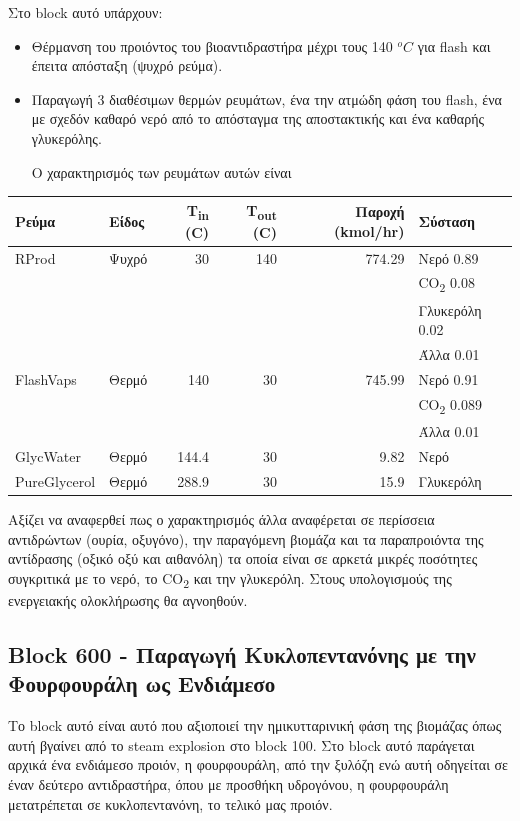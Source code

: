 \documentclass[11pt]{article}
\begin{document}
Στο block αυτό υπάρχουν:
\begin{itemize}
\item Θέρμανση του προιόντος του βιοαντιδραστήρα μέχρι τους 140 \(^oC\) για flash και έπειτα απόσταξη (ψυχρό ρεύμα).
\item Παραγωγή 3 διαθέσιμων θερμών ρευμάτων, ένα την ατμώδη φάση του flash, ένα με σχεδόν καθαρό νερό από το απόσταγμα της αποστακτικής και ένα καθαρής γλυκερόλης.

Ο χαρακτηρισμός των ρευμάτων αυτών είναι
\end{itemize}
\begin{center}
\begin{tabular}{llrrrl}
Ρεύμα & Είδος & Τ\textsubscript{in} (C) & Τ\textsubscript{out} (C) & Παροχή (kmol/hr) & Σύσταση\\
\hline
RProd & Ψυχρό & 30 & 140 & 774.29 & Νερό 0.89\\
 &  &  &  &  & CO\textsubscript{2} 0.08\\
 &  &  &  &  & Γλυκερόλη 0.02\\
 &  &  &  &  & Άλλα 0.01\\
\hline
FlashVaps & Θερμό & 140 & 30 & 745.99 & Νερό 0.91\\
 &  &  &  &  & CO\textsubscript{2} 0.089\\
 &  &  &  &  & Άλλα 0.01\\
\hline
GlycWater & Θερμό & 144.4 & 30 & 9.82 & Νερό\\
\hline
PureGlycerol & Θερμό & 288.9 & 30 & 15.9 & Γλυκερόλη\\
\hline
\end{tabular}
\end{center}

Αξίζει να αναφερθεί πως ο χαρακτηρισμός άλλα αναφέρεται σε περίσσεια αντιδρώντων (ουρία, οξυγόνο), την παραγόμενη βιομάζα και τα παραπροιόντα της αντίδρασης (οξικό οξύ και αιθανόλη) τα οποία είναι σε αρκετά μικρές ποσότητες συγκριτικά με το νερό, το CO\textsubscript{2} και την γλυκερόλη. Στους υπολογισμούς της ενεργειακής ολοκλήρωσης θα αγνοηθούν.

\subsection{Block 600 - Παραγωγή Κυκλοπεντανόνης με την Φουρφουράλη ως Ενδιάμεσο}
\label{sec:orgd660758}
Το block αυτό είναι αυτό που αξιοποιεί την ημικυτταρινική φάση της βιομάζας όπως αυτή βγαίνει από το steam explosion στο block 100. Στο block αυτό παράγεται αρχικά ένα ενδιάμεσο προιόν, η φουρφουράλη, από την ξυλόζη ενώ αυτή οδηγείται σε έναν δεύτερο αντιδραστήρα, όπου με προσθήκη υδρογόνου, η φουρφουράλη μετατρέπεται σε κυκλοπεντανόνη, το τελικό μας προιόν.
\end{document}
